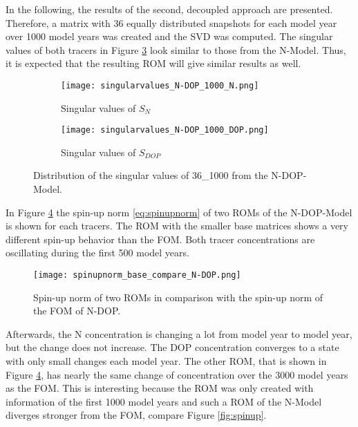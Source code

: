 In the following, the results of the second, decoupled approach are presented. Therefore, a matrix with 36 equally distributed snapshots for each model year over 1000 model years was created and the 
SVD was computed. The singular values of both tracers in Figure \ref{fig:singularvalues_N-DOP} look similar to those from the N-Model. Thus, it is expected that the resulting ROM will give similar results as well.

\begin{figure}[H]
\begin{subfigure}{.48\textwidth}
  \texttt{[image: singularvalues\_N-DOP\_1000\_N.png]}
  \caption{Singular values of $S_N$}
  \label{fig:sing_N-DOP_sub1}
\end{subfigure}%
\begin{subfigure}{.5\textwidth}
  \centering
  \texttt{[image: singularvalues\_N-DOP\_1000\_DOP.png]}
  \caption{Singular values of $S_{DOP}$}
  \label{fig:sing_N-DOP_sub2}
\end{subfigure}
\caption{Distribution of the singular values of 36\_1000 from the N-DOP-Model.}
\label{fig:singularvalues_N-DOP}
\end{figure}

In Figure \ref{fig:spinup_N-DOP} the spin-up norm \eqref{eq:spinupnorm} of two ROMs of the N-DOP-Model is shown for each tracers. 
The ROM with the smaller base matrices shows a very different spin-up behavior than the FOM. Both tracer concentrations
are oscillating during the first 500 model years. 
\begin{figure}[ht]
\centering
  \texttt{[image: spinupnorm\_base\_compare\_N-DOP.png]}
  \caption{Spin-up norm of two ROMs in comparison with the spin-up norm of the FOM of N-DOP.}
  \label{fig:spinup_N-DOP}
\end{figure}
Afterwards, the N concentration is changing a lot from model year to model year, but the change
does not increase. The DOP concentration converges to a state with only small changes each model year.
The other ROM, that is shown in Figure \ref{fig:spinup_N-DOP}, has nearly the same change of concentration over the 3000 model years as the FOM. This is interesting because
the ROM was only created with information of the first 1000 model years and such a ROM of the N-Model diverges stronger from the FOM, compare Figure \ref{fig:spinup}.

